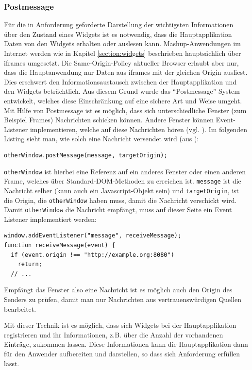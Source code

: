 \subsubsection*{Postmessage}
Für die in Anforderung  geforderte Darstellung der wichtigsten Informationen über den Zustand eines Widgets ist es notwendig, dass die Hauptapplikation Daten von den Widgets erhalten oder auslesen kann. Mashup-Anwendungen im Internet werden wie in Kapitel \ref{section:widgets} beschrieben hauptsächlich über iframes umgesetzt. Die Same-Origin-Policy aktueller Browser erlaubt aber nur, dass die Hauptanwendung nur Daten aus iframes mit der gleichen Origin ausliest. Dies erschwert den Informationsaustausch zwischen der Hauptapplikation und den Widgets beträchtlich. Aus diesem Grund wurde das "`Postmessage"'-System entwickelt, welches diese Einschränkung auf eine sichere Art und Weise umgeht. Mit Hilfe von Postmessage ist es möglich, dass sich unterschiedliche Fenster (zum Beispiel Frames) Nachrichten schicken können. Andere Fenster können Event-Listener implementieren, welche auf diese Nachrichten hören (vgl. \cite{MDN2012}). Im folgenden Listing sieht man, wie solch eine Nachricht versendet wird (aus \cite{MDN2012}):
\begin{lstlisting}
otherWindow.postMessage(message, targetOrigin);
\end{lstlisting}
\texttt{otherWindow} ist hierbei eine Referenz auf ein anderes Fenster oder einen anderen Frame, welches über Standard-DOM-Methoden zu erreichen ist. \texttt{message} ist die Nachricht selber (kann auch ein Javascript-Objekt sein) und \texttt{targetOrigin}, ist die Origin, die \texttt{otherWindow} haben muss, damit die Nachricht verschickt wird. Damit \texttt{otherWindow} die Nachricht empfängt, muss auf dieser Seite ein Event Listener implementiert werden:
\begin{lstlisting}
window.addEventListener("message", receiveMessage);
function receiveMessage(event) {
  if (event.origin !== "http://example.org:8080")
    return;
  // ...
\end{lstlisting}
Empfängt das Fenster also eine Nachricht ist es möglich auch den Origin des Senders zu prüfen, damit man nur Nachrichten aus vertrauenswürdigen Quellen bearbeitet.

Mit dieser Technik ist es möglich, dass sich Widgets bei der Hauptapplikation registrieren und ihr Informationen, z.B. über die Anzahl der vorhandenen Einträge, zukommen lassen. Diese Informationen kann die Hauptapplikation dann für den Anwender aufbereiten und darstellen, so dass sich Anforderung  erfüllen lässt.

